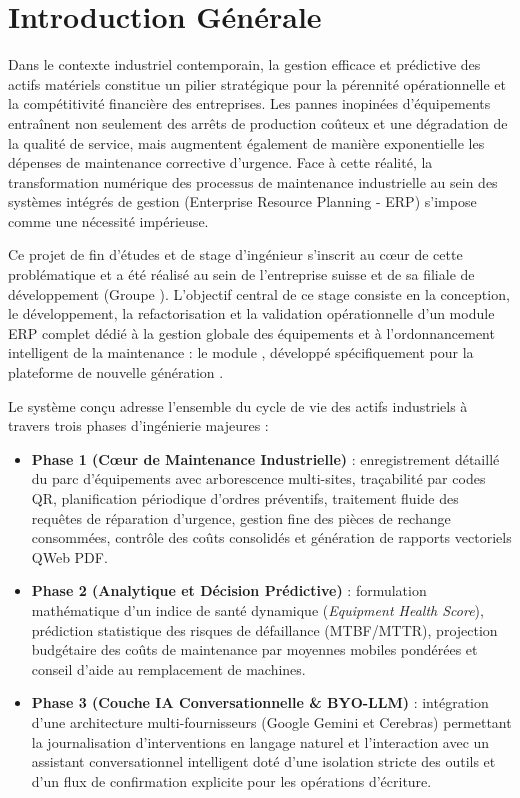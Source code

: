 \chapter*{Introduction Générale}
\label{chap:general_introduction}

Dans le contexte industriel contemporain, la gestion efficace et prédictive des actifs matériels constitue un pilier stratégique pour la pérennité opérationnelle et la compétitivité financière des entreprises. Les pannes inopinées d'équipements entraînent non seulement des arrêts de production coûteux et une dégradation de la qualité de service, mais augmentent également de manière exponentielle les dépenses de maintenance corrective d'urgence. Face à cette réalité, la transformation numérique des processus de maintenance industrielle au sein des systèmes intégrés de gestion (Enterprise Resource Planning - ERP) s'impose comme une nécessité impérieuse.

Ce projet de fin d'études et de stage d'ingénieur s'inscrit au cœur de cette problématique et a été réalisé au sein de l'entreprise suisse \textbf{\companyName} et de sa filiale de développement \textbf{\companySubsidiary} (Groupe \companyGroup). L'objectif central de ce stage consiste en la conception, le développement, la refactorisation et la validation opérationnelle d'un module ERP complet dédié à la gestion globale des équipements et à l'ordonnancement intelligent de la maintenance : le module \textbf{\odooModule}, développé spécifiquement pour la plateforme de nouvelle génération \textbf{\odooVersion}.

Le système conçu adresse l'ensemble du cycle de vie des actifs industriels à travers trois phases d'ingénierie majeures : 
\begin{itemize}[leftmargin=1.5cm, label=\textcolor{odooPurple}{\small\textbullet}]
    \item \textbf{Phase 1 (Cœur de Maintenance Industrielle)} : enregistrement détaillé du parc d'équipements avec arborescence multi-sites, traçabilité par codes QR, planification périodique d'ordres préventifs, traitement fluide des requêtes de réparation d'urgence, gestion fine des pièces de rechange consommées, contrôle des coûts consolidés et génération de rapports vectoriels QWeb PDF.
    \item \textbf{Phase 2 (Analytique et Décision Prédictive)} : formulation mathématique d'un indice de santé dynamique (\textit{Equipment Health Score}), prédiction statistique des risques de défaillance (MTBF/MTTR), projection budgétaire des coûts de maintenance par moyennes mobiles pondérées et conseil d'aide au remplacement de machines.
    \item \textbf{Phase 3 (Couche IA Conversationnelle \& BYO-LLM)} : intégration d'une architecture multi-fournisseurs (Google Gemini et Cerebras) permettant la journalisation d'interventions en langage naturel et l'interaction avec un assistant conversationnel intelligent doté d'une isolation stricte des outils et d'un flux de confirmation explicite pour les opérations d'écriture.
\end{itemize}


